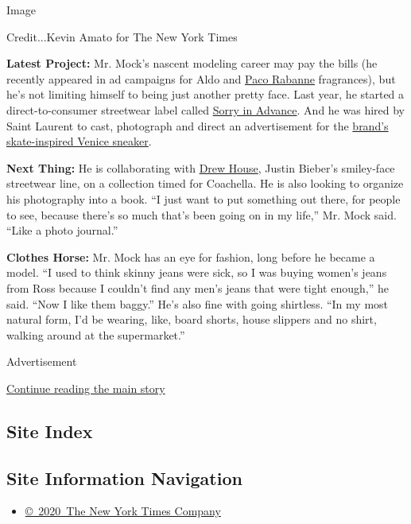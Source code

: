 Image

Credit...Kevin Amato for The New York Times

\textbf{Latest Project:} Mr. Mock's nascent modeling career may pay the
bills (he recently appeared in ad campaigns for Aldo and
\href{https://www.instagram.com/p/BzeRAzPD8bD/}{Paco Rabanne}
fragrances), but he's not limiting himself to being just another pretty
face. Last year, he started a direct-to-consumer streetwear label called
\href{https://sorryinadvance.co/}{Sorry in Advance}. And he was hired by
Saint Laurent to cast, photograph and direct an advertisement for the
\href{https://hypebeast.com/2019/11/saint-laurent-venice-sneaker-lookbook-uk}{brand's
skate-inspired Venice sneaker}.

\textbf{Next Thing:} He is collaborating with
\href{https://thehouseofdrew.com/}{Drew House}, Justin Bieber's
smiley-face streetwear line, on a collection timed for Coachella. He is
also looking to organize his photography into a book. ``I just want to
put something out there, for people to see, because there's so much
that's been going on in my life,'' Mr. Mock said. ``Like a photo
journal.''

\textbf{Clothes Horse:} Mr. Mock has an eye for fashion, long before he
became a model. ``I used to think skinny jeans were sick, so I was
buying women's jeans from Ross because I couldn't find any men's jeans
that were tight enough,'' he said. ``Now I like them baggy.'' He's also
fine with going shirtless. ``In my most natural form, I'd be wearing,
like, board shorts, house slippers and no shirt, walking around at the
supermarket.''

Advertisement

\protect\hyperlink{after-bottom}{Continue reading the main story}

\hypertarget{site-index}{%
\subsection{Site Index}\label{site-index}}

\hypertarget{site-information-navigation}{%
\subsection{Site Information
Navigation}\label{site-information-navigation}}

\begin{itemize}
\tightlist
\item
  \href{https://help.nytimes.com/hc/en-us/articles/115014792127-Copyright-notice}{©~2020~The
  New York Times Company}
\end{itemize}

